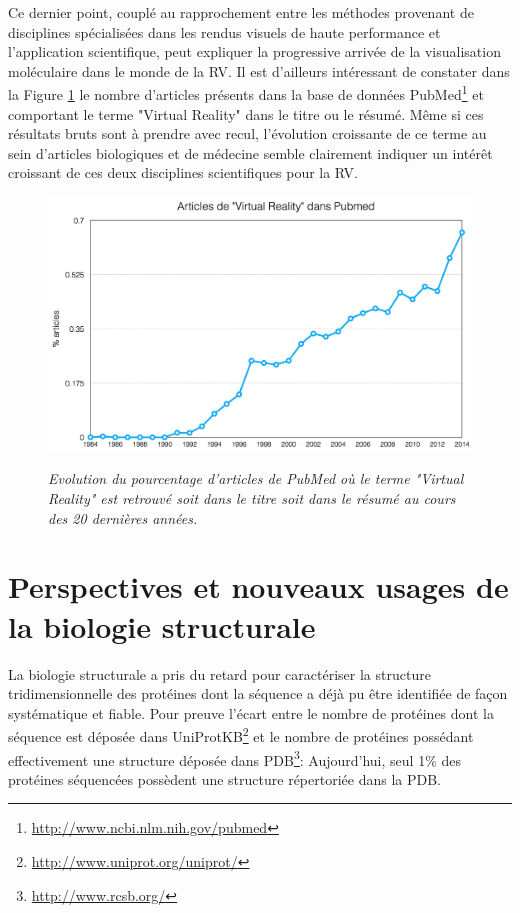Ce dernier point, couplé au rapprochement entre les méthodes provenant de disciplines spécialisées dans les rendus visuels de haute performance et l'application scientifique, peut expliquer la progressive arrivée de la visualisation moléculaire dans le monde de la RV. Il est d'ailleurs intéressant de constater dans la Figure \ref{Fig:VR_pubmed_trend} le nombre d'articles présents dans la base de données PubMed\footnote{\url{http://www.ncbi.nlm.nih.gov/pubmed}} et comportant le terme "Virtual Reality" dans le titre ou le résumé. Même si ces résultats bruts sont à prendre avec recul, l'évolution croissante de ce terme au sein d'articles biologiques et de médecine semble clairement indiquer un intérêt croissant de ces deux disciplines scientifiques pour la RV.

\begin{figure}
  \centering
  {\includegraphics[width=.75\linewidth]{./figures/ch1/VR_pubmed_trend.png}}
    \caption{{\it Evolution du pourcentage d'articles de PubMed où le terme "Virtual Reality" est retrouvé soit dans le titre soit dans le résumé au cours des 20 dernières années.}}
  \label{Fig:VR_pubmed_trend}
  \hspace{0.2cm}
\end{figure}

\section{Perspectives et nouveaux usages de la biologie structurale} \label{limits_persp_bio_struct}

La biologie structurale a pris du retard pour caractériser la structure tridimensionnelle des protéines dont la séquence a déjà pu être identifiée de façon systématique et fiable. Pour preuve l'écart entre le nombre de protéines dont la séquence est déposée dans UniProtKB\footnote{\url{http://www.uniprot.org/uniprot/}} et le nombre de protéines possédant effectivement une structure déposée dans PDB\footnote{\url{http://www.rcsb.org/}}: Aujourd'hui, seul 1\% des protéines séquencées possèdent une structure répertoriée dans la PDB. 

